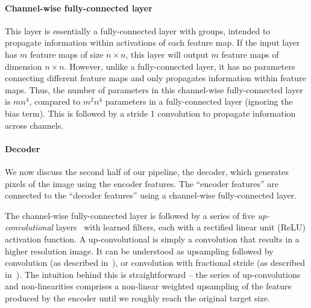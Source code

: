 \documentclass[10pt,twocolumn,letterpaper]{article}
\begin{document}
\paragraph{Channel-wise fully-connected layer}
This layer is essentially a fully-connected layer with groups, intended to propagate information within activations of each feature map.
If the input layer has $m$ feature maps of size $n\times n$, this layer will output $m$ feature maps of dimension $n\times n$.
However, unlike a fully-connected layer, it has no parameters connecting different feature maps and only propagates information within feature maps.
Thus, the number of parameters in this channel-wise fully-connected layer is $mn^4$, compared to $m^2n^4$ parameters in a fully-connected layer (ignoring the bias term).
This is followed by a stride 1 convolution to propagate information across channels.

\paragraph{Decoder}
We now discuss the second half of our pipeline, the decoder, which generates pixels of the image using the encoder features.
The ``encoder features'' are connected to the ``decoder features'' using a channel-wise fully-connected layer.

The channel-wise fully-connected layer is followed by a series of five \textit{up-convolutional} layers~\cite{ZeilerF14,chairs,long2014fully} with learned filters, each with a rectified linear unit (ReLU) activation function.
A up-convolutional is simply a convolution that results in a higher resolution image.
It can be understood as upsampling followed by convolution (as described in~\cite{chairs}), or convolution with fractional stride (as described in~\cite{long2014fully}).
The intuition behind this is straightforward -- the series of up-convolutions and non-linearities comprises a non-linear weighted upsampling of the feature produced by the encoder until we roughly reach the original target size.
\end{document}
